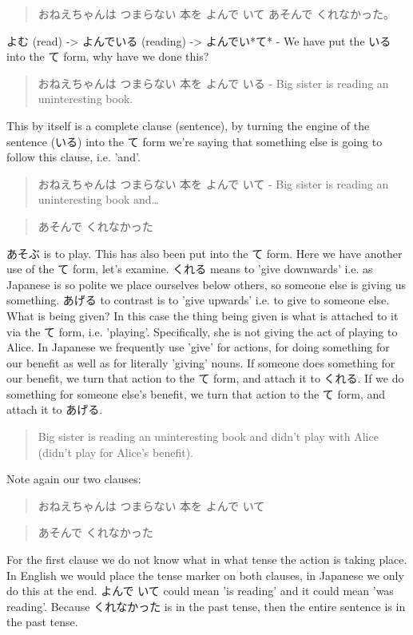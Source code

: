\documentclass[11pt]{article}
\begin{document}
\begin{quote}
おねえちゃんは つまらない 本を よんで いて あそんで くれなかった。
\end{quote}
よむ (read) -> よんでいる (reading) -> よんでい*て* - We have put the いる into the て form, why have we done this?
\begin{quote}
おねえちゃんは つまらない 本を よんで いる - Big sister is reading an uninteresting book.
\end{quote}
This by itself is a complete clause (sentence), by turning the engine of the sentence (いる) into the て form we're saying that something else is going to follow this clause, i.e. 'and'.
\begin{quote}
おねえちゃんは つまらない 本を よんで いて - Big sister is reading an uninteresting book and\ldots{}
\end{quote}
\begin{quote}
あそんで くれなかった
\end{quote}
あそぶ is to play. This has also been put into the て form. Here we have another use of the て form, let's examine. くれる means to 'give downwards' i.e. as Japanese is so polite we place ourselves below others, so someone else is giving us something. あげる to contrast is to 'give upwards' i.e. to give to someone else. What is being given? In this case the thing being given is what is attached to it via the て form, i.e. 'playing'. Specifically, she is not giving the act of playing to Alice. In Japanese we frequently use 'give' for actions, for doing something for our benefit as well as for literally 'giving' nouns. If someone does something for our benefit, we turn that action to the て form, and attach it to くれる. If we do something for someone else's benefit, we turn that action to the て form, and attach it to あげる.
\begin{quote}
Big sister is reading an uninteresting book and didn't play with Alice (didn't play for Alice's benefit).
\end{quote}

Note again our two clauses:
\begin{quote}
おねえちゃんは つまらない 本を よんで いて
\end{quote}
\begin{quote}
あそんで くれなかった
\end{quote}
For the first clause we do not know what in what tense the action is taking place. In English we would place the tense marker on both clauses, in Japanese we only do this at the end. よんで いて could mean 'is reading' and it could mean 'was reading'. Because くれなかった is in the past tense, then the entire sentence is in the past tense.
\end{document}

